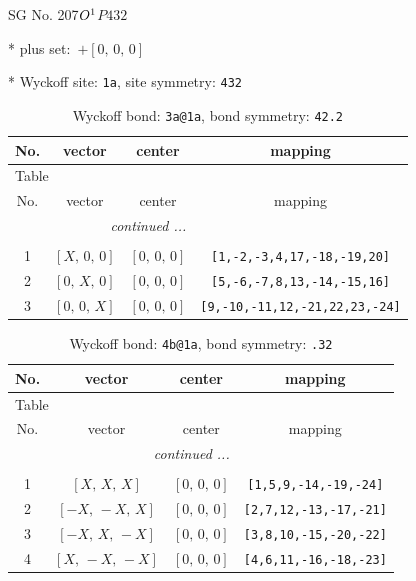 \documentclass[fleqn,8pt]{jsarticle}
\begin{document}
\setcounter{MaxMatrixCols}{32}

\renewcommand{\tablename}{Table~}
\renewcommand{\figurename}{Figure~}
\begin{center}
\LARGE
SG No. 207\quad$O_{\rm }^{1}$\quad$P432$\quad[ cubic ]
\end{center}

* plus set:\,\,\,$+\left[ 0,\, 0,\, 0 \right]$


* Wyckoff site: {\tt 1a}, site symmetry: {\tt 432}
\renewcommand{\arraystretch}{1.2}
\begin{longtable}{cccc}
\caption{Wyckoff bond: {\tt 3a@1a}, bond symmetry: {\tt 42.2}}
 \\
 \hline \hline
No. & vector & center & mapping \\ \hline \endfirsthead

\multicolumn{3}{l}{\tablename\ \thetable{}} \\
 \hline \hline
No. & vector & center & mapping \\ \hline \endhead

 \hline \hline
\multicolumn{3}{r}{\footnotesize\it continued ...} \\ \endfoot

 \hline \hline
\multicolumn{3}{r}{} \\ \endlastfoot

1 & $\left[ X,\, 0,\, 0 \right]$ & $\left[ 0,\, 0,\, 0 \right]$ & {\tt [1,-2,-3,4,17,-18,-19,20]} \\ \hline
2 & $\left[ 0,\, X,\, 0 \right]$ & $\left[ 0,\, 0,\, 0 \right]$ & {\tt [5,-6,-7,8,13,-14,-15,16]} \\ \hline
3 & $\left[ 0,\, 0,\, X \right]$ & $\left[ 0,\, 0,\, 0 \right]$ & {\tt [9,-10,-11,12,-21,22,23,-24]} \\
\end{longtable}
\renewcommand{\arraystretch}{1.2}
\begin{longtable}{cccc}
\caption{Wyckoff bond: {\tt 4b@1a}, bond symmetry: {\tt .32}}
 \\
 \hline \hline
No. & vector & center & mapping \\ \hline \endfirsthead

\multicolumn{3}{l}{\tablename\ \thetable{}} \\
 \hline \hline
No. & vector & center & mapping \\ \hline \endhead

 \hline \hline
\multicolumn{3}{r}{\footnotesize\it continued ...} \\ \endfoot

 \hline \hline
\multicolumn{3}{r}{} \\ \endlastfoot

1 & $\left[ X,\, X,\, X \right]$ & $\left[ 0,\, 0,\, 0 \right]$ & {\tt [1,5,9,-14,-19,-24]} \\ \hline
2 & $\left[ - X,\, - X,\, X \right]$ & $\left[ 0,\, 0,\, 0 \right]$ & {\tt [2,7,12,-13,-17,-21]} \\ \hline
3 & $\left[ - X,\, X,\, - X \right]$ & $\left[ 0,\, 0,\, 0 \right]$ & {\tt [3,8,10,-15,-20,-22]} \\ \hline
4 & $\left[ X,\, - X,\, - X \right]$ & $\left[ 0,\, 0,\, 0 \right]$ & {\tt [4,6,11,-16,-18,-23]} \\
\end{longtable}
\end{document}
